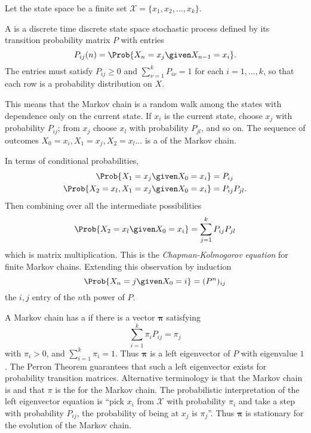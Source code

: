 \documentclass[12pt]{article}
\begin{document}
Let the state space be a finite set \( \mathcal{X}=\{x_1,x_2,\ldots,x_k\}
\).
\begin{definition}
    A  is a discrete time discrete state space
    stochastic process%
    defined by its transition probability matrix \( P \) with entries
    \[
        P_{ij}(n)=\Prob{X_n=x_j \given X_{n-1}=x_i}.
    \] The entries must satisfy \( P_{ij} \ge 0 \) and \( \sum_{\nu=1}^k P_
    {i \nu} = 1 \) for each \( i=1, \dots, k \), so that each row is a
    probability distribution on \( X \).
\end{definition}

This means that the Markov chain is a random walk among the states with
dependence only on the current state.  If \( x_i \) is the current
state, choose \( x_j \) with probability \( P_{ij} \); from \( x_j \)
choose \( x_l \) with probability \( P_{jl} \), and so on.  The sequence
of outcomes \( X_0 = x_i, X_1 = x_j, X_2 = x_l \dots \) is a  of the Markov chain.%

In terms of conditional probabilities,
\begin{align*}
    \Prob{X_1 = x_j \given X_0 = x_{i}} &= P_{ij} \\
    \Prob{X_2 = x_l, X_1 = x_j \given X_0 = x_i} &= P_{ij}P_{jl}.  \\
\end{align*}
Then combining over all the intermediate possibilities
\[
    \Prob{X_2 = x_l \given X_0 = x_i} = \sum\limits_{j =1}^k P_{ij}P_{jl}
\] which is matrix multiplication.  This is the \textit{Chapman-Kolmogorov
equation} for finite Markov chains.%
Extending this observation by induction
\[
    \Prob{X_n = j \given X_0 = i} = (P^n)_{ij}
\] the \( i,j \) entry of the \( n \)th power of \( P \).

A Markov chain has a  if there is a vector
\( \mathbf{\pi} \) satisfying
\[
    \sum\limits_{i=1}^k \pi_i P_{ij} = \pi_{j}
\] with \( \pi_i > 0 \), and \( \sum_{i=1}^k \pi_i = 1 \).  Thus \(
\mathbf{\pi} \) is a left eigenvector of \( P \) with eigenvalue \( 1
\).  The Perron Theorem guarantees that such a left eigenvector exists
for probability transition matrices.
Alternative terminology is that the Markov chain is  and that \( \pi \) is the %
for the Markov chain.  The probabilistic interpretation of the left
eigenvector equation is ``pick \( x_i \) from \( \mathcal{X} \) with
probability \( \pi_i \) and take a step with probability \( P_{ij} \),
the probability of being at \( x_j \) is \( \pi_{j} \)''.  Thus \(
\mathbf{\pi} \) is stationary for the evolution of the Markov chain.
\end{document}
